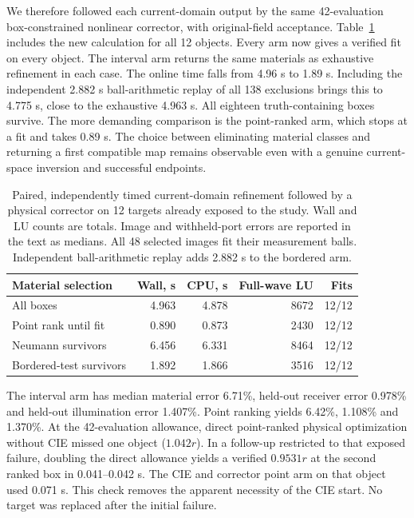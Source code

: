 We therefore followed each current-domain output by the same 42-evaluation box-constrained nonlinear corrector, with original-field acceptance. Table~\ref{tab:ciepool} includes the new calculation for all 12 objects. Every arm now gives a verified fit on every object. The interval arm returns the same materials as exhaustive refinement in each case. The online time falls from 4.96 s to 1.89 s. Including the independent 2.882 s ball-arithmetic replay of all 138 exclusions brings this to 4.775 s, close to the exhaustive 4.963 s. All eighteen truth-containing boxes survive. The more demanding comparison is the point-ranked arm, which stops at a fit and takes 0.89 s. The choice between eliminating material classes and returning a first compatible map remains observable even with a genuine current-space inversion and successful endpoints.
\begin{table}[!htbp]\centering\small
\caption{Paired, independently timed current-domain refinement followed by a physical corrector on 12 targets already exposed to the study. Wall and LU counts are totals. Image and withheld-port errors are reported in the text as medians. All 48 selected images fit their measurement balls. Independent ball-arithmetic replay adds 2.882 s to the bordered arm.}\label{tab:ciepool}
\begin{tabular}{@{}lrrrr@{}}\toprule
Material selection & Wall, s & CPU, s & Full-wave LU & Fits\\\midrule
All boxes & 4.963 & 4.878 & 8672 & 12/12\\
Point rank until fit & 0.890 & 0.873 & 2430 & 12/12\\
Neumann survivors & 6.456 & 6.331 & 8464 & 12/12\\
Bordered-test survivors & 1.892 & 1.866 & 3516 & 12/12\\\bottomrule
\end{tabular}
\end{table}
The interval arm has median material error 6.71\%, held-out receiver error 0.978\% and held-out illumination error 1.407\%. Point ranking yields 6.42\%, 1.108\% and 1.370\%. At the 42-evaluation allowance, direct point-ranked physical optimization without CIE missed one object ($1.042r$). In a follow-up restricted to that exposed failure, doubling the direct allowance yields a verified $0.9531r$ at the second ranked box in 0.041--0.042 s. The CIE and corrector point arm on that object used 0.071 s. This check removes the apparent necessity of the CIE start. No target was replaced after the initial failure.

